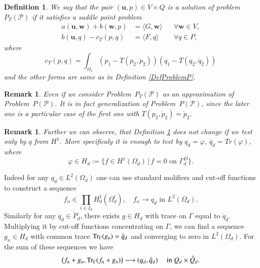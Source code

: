 \documentclass{elsarticle}
\newtheorem{definition}[thm]{Definition}
\newtheorem{remark}[thm]{Remark}
\def\Tr{{\rm Tr}}
\def\vc#1{\mathbf{\boldsymbol{#1}}}     %
\def\where{\,|\,}                    %
\def\vl{{\vc{u}}}
\def\phi{\varphi}
\def\conv{\longrightarrow}
\def\mr{\mathring}
\begin{document}
\begin{definition}
\label{DefProblemPT}
We say that the pair $(\vl,p)\in V\times Q$ is a solution of problem $P_T(\mathcal P)$ if 
it satisfies a saddle point problem
\begin{align}
        \label{SaddlePT1}
 a(\vl,\vc w) + b(\vc w, p) &= \langle G, \vc w \rangle &&\forall \vc w\in V,\\
        \label{SaddlePT2}
 b(\vl, q) - c_T(p,q) &= \langle F, q \rangle &&\forall q \in P,
\end{align}where
\begin{equation*}
 c_T(p,q)=\int_{\Omega_1} (p_1-T(p_2,\mr{p}_2))(q_1-T(q_2,\mr{q}_2))
\end{equation*}
and the other forms are same as in Definition \ref{DefProblemP}.
\end{definition}

\begin{remark}
Even if we consider Problem~$P_T(\mathcal P)$ as an approximation of Problem~$P(\mathcal P)$. It is in fact
generalization of Problem~$P(\mathcal P)$, since the later one is a particular case of the first one with $T(p_2,\mr{p}_2)=\mr{p}_2$.
\end{remark}

\begin{remark}
Further we can observe, that Definition \ref{DefProblemPT} does not change if we test only by $q$ from $H^1$. More specificaly it is enough to test by $q_d=\phi$, $\mr{q_d}=Tr(\phi)$, where
\begin{equation}\label{SobolevTestFunc}
  \phi\in H_d:=\{f\in H^1(\Omega_d)\where f=0 \text{ on } \Gamma_d^D\}.
\end{equation}
\end{remark}

Indeed for any $q_d\in L^2(\Omega_d)$ one can use standard molifiers and cut-off functions to construct a sequence
\[
  f_n \in \prod_{i\in I_d} H_0^1(\Omega_d^i),\quad f_n\conv q_d \text{ in  }L^2(\Omega_d).
\]
Similarly for any $\mr{q}_d\in \mr{P}_d$, there exists $g\in H_d$ with trace on $\Gamma$ equal to $\mr{q}_d$.
Multiplying it by cut-off functions concentrating on $\Gamma$, we can find a sequence $g_n\in H_d$ with common trace $\Tr_{\Gamma}(g_n)=\mr{q}_d$ and converging to zero in $L^2(\Omega_d)$. For the sum of these sequences we have
\[
 \big( f_n+g_n, \Tr_\Gamma(f_n+g_n) \big) \conv (q_d,\mr{q}_d)\quad \text{ in } Q_d\times\mr{Q}_d.
\]
\end{document}

